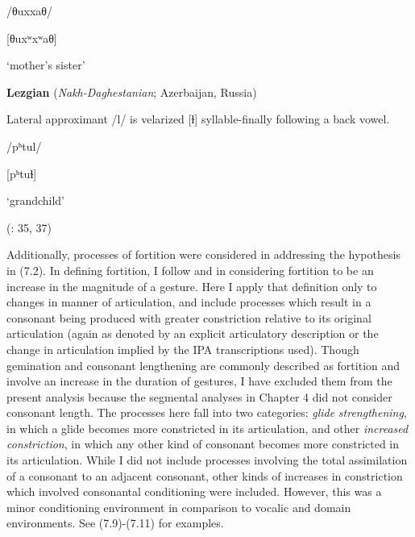 /θuxxaθ/



[θuxʷxʷaθ]



‘mother’s sister’



\citep[8]{Bright1957}


\z

\ea\label{ex:(7.8)}
  \textbf{Lezgian} (\textit{Nakh-Daghestanian}; Azerbaijan, Russia)



Lateral approximant /l/ is velarized [ɫ] syllable-finally following a back vowel.



/pʰtul/



[pʰtuɫ]



‘grandchild’



(\citealt{Haspelmath1993}: 35, 37)
\z



  Additionally, processes of fortition were considered in addressing the hypothesis in (7.2). In defining fortition, I follow \citet{Bybee2015b} and \citet{BybeeEasterday2019} in considering fortition to be an increase in the magnitude of a gesture. Here I apply that definition only to changes in manner of articulation, and include processes which result in a consonant being produced with greater constriction relative to its original articulation (again as denoted by an explicit articulatory description or the change in articulation implied by the IPA transcriptions used). Though gemination and consonant lengthening are commonly described as fortition and involve an increase in the duration of gestures, I have excluded them from the present analysis because the segmental analyses in Chapter 4 did not consider consonant length. The processes here fall into two categories: \textit{glide} \textit{strengthening}, in which a glide becomes more constricted in its articulation, and other \textit{increased} \textit{constriction}, in which any other kind of consonant becomes more constricted in its articulation. While I did not include processes involving the total assimilation of a consonant to an adjacent consonant, other kinds of increases in constriction which involved consonantal conditioning were included. However, this was a minor conditioning environment in comparison to vocalic and domain environments. See (7.9)-(7.11) for examples.




